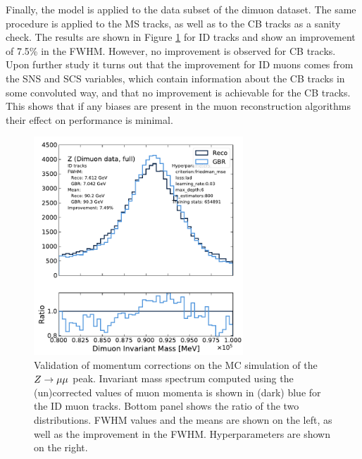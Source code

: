 Finally, the model is applied to the data subset of the dimuon dataset.
The same procedure is applied to the MS tracks, as well as to the CB
tracks as a sanity check. The results are shown in Figure
\ref{fig:muon:vader-dimuon} for ID tracks and show an improvement
of 7.5\% in the FWHM. However, no improvement is observed for CB tracks.
Upon further study it turns out that the improvement for ID muons comes
from the SNS and SCS variables, which contain information about the CB
tracks in some convoluted way, and that no improvement is achievable
for the CB tracks. This shows that if any biases are present in
the muon reconstruction algorithms their effect on performance is minimal.
\begin{figure}[h!]
  \centering
  \includegraphics[width=0.7\textwidth]{figures/muons/vader-dimuon-ID}
  \caption[VADER4$\mu$ correction on the dimuon dataset.]
  {Validation of momentum corrections on the MC simulation of the $Z \rightarrow \mu\mu$
  peak. Invariant mass spectrum computed using the (un)corrected values
  of muon momenta is shown in (dark) blue for the ID muon tracks. Bottom
  panel shows the ratio of the two distributions. FWHM values and the means
  are shown on the left, as well as the improvement in the FWHM.
  Hyperparameters are shown on the right.}
  \label{fig:muon:vader-dimuon}
\end{figure}

